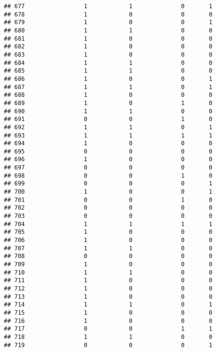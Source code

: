 \documentclass[]{article}
\begin{document}
\begin{verbatim}
## 677                 1            1              0       1
## 678                 1            0              0       0
## 679                 1            0              0       1
## 680                 1            1              0       0
## 681                 1            0              0       0
## 682                 1            0              0       0
## 683                 1            0              0       0
## 684                 1            1              0       0
## 685                 1            1              0       0
## 686                 1            0              0       1
## 687                 1            1              0       1
## 688                 1            0              0       0
## 689                 1            0              1       0
## 690                 1            1              0       0
## 691                 0            0              1       0
## 692                 1            1              0       1
## 693                 1            1              1       1
## 694                 1            0              0       0
## 695                 0            0              0       0
## 696                 1            0              0       0
## 697                 0            0              0       0
## 698                 0            0              1       0
## 699                 0            0              0       1
## 700                 1            0              0       1
## 701                 0            0              1       0
## 702                 0            0              0       0
## 703                 0            0              0       0
## 704                 1            1              1       1
## 705                 1            0              0       0
## 706                 1            0              0       0
## 707                 1            1              0       0
## 708                 0            0              0       0
## 709                 1            0              0       0
## 710                 1            1              0       0
## 711                 1            0              0       0
## 712                 1            0              0       0
## 713                 1            0              0       0
## 714                 1            1              0       1
## 715                 1            0              0       0
## 716                 1            0              0       0
## 717                 0            0              1       1
## 718                 1            1              0       0
## 719                 0            0              0       1

\end{verbatim}
\end{document}
